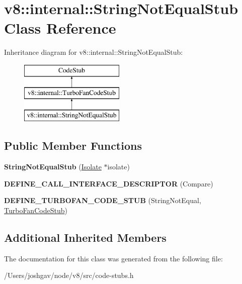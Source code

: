 \hypertarget{classv8_1_1internal_1_1_string_not_equal_stub}{}\section{v8\+:\+:internal\+:\+:String\+Not\+Equal\+Stub Class Reference}
\label{classv8_1_1internal_1_1_string_not_equal_stub}
Inheritance diagram for v8\+:\+:internal\+:\+:String\+Not\+Equal\+Stub\+:\begin{figure}[H]
\begin{center}
\leavevmode
\includegraphics[height=3.000000cm]{classv8_1_1internal_1_1_string_not_equal_stub}
\end{center}
\end{figure}
\subsection*{Public Member Functions}
\begin{DoxyCompactItemize}
\item 
{\bfseries String\+Not\+Equal\+Stub} (\hyperlink{classv8_1_1internal_1_1_isolate}{Isolate} $\ast$isolate)\hypertarget{classv8_1_1internal_1_1_string_not_equal_stub_ac6d719b0f68d567bfb8f0abfd8890aaa}{}\label{classv8_1_1internal_1_1_string_not_equal_stub_ac6d719b0f68d567bfb8f0abfd8890aaa}

\item 
{\bfseries D\+E\+F\+I\+N\+E\+\_\+\+C\+A\+L\+L\+\_\+\+I\+N\+T\+E\+R\+F\+A\+C\+E\+\_\+\+D\+E\+S\+C\+R\+I\+P\+T\+OR} (Compare)\hypertarget{classv8_1_1internal_1_1_string_not_equal_stub_a5bb1a3d46c13f4cecd06b6ad23dfb598}{}\label{classv8_1_1internal_1_1_string_not_equal_stub_a5bb1a3d46c13f4cecd06b6ad23dfb598}

\item 
{\bfseries D\+E\+F\+I\+N\+E\+\_\+\+T\+U\+R\+B\+O\+F\+A\+N\+\_\+\+C\+O\+D\+E\+\_\+\+S\+T\+UB} (String\+Not\+Equal, \hyperlink{classv8_1_1internal_1_1_turbo_fan_code_stub}{Turbo\+Fan\+Code\+Stub})\hypertarget{classv8_1_1internal_1_1_string_not_equal_stub_ab8ab7ed74d5cb1a1f76fee5bf4157fd6}{}\label{classv8_1_1internal_1_1_string_not_equal_stub_ab8ab7ed74d5cb1a1f76fee5bf4157fd6}

\end{DoxyCompactItemize}
\subsection*{Additional Inherited Members}


The documentation for this class was generated from the following file\+:\begin{DoxyCompactItemize}
\item 
/\+Users/joshgav/node/v8/src/code-\/stubs.\+h\end{DoxyCompactItemize}
